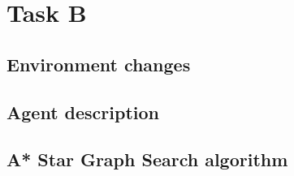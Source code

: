 
\chapter{Task B}
\section{Environment changes}

\section{Agent description}


\section{A* Star Graph Search algorithm}


